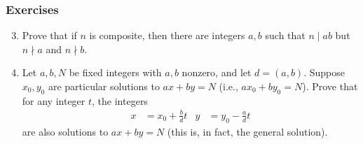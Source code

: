 \documentclass[../notes.tex]{subfiles}
\begin{document}
\subsubsection*{Exercises}
\begin{enumerate}[label={\textbf{\arabic*.}},ref={0.2.\arabic*}]
    \setcounter{enumi}{2}
    \item \label{exr:0.2.3}Prove that if $n$ is composite, then there are integers $a,b$ such that $n\mid ab$ but $n\nmid a$ and $n\nmid b$.
    \item \label{exr:0.2.4}Let $a,b,N$ be fixed integers with $a,b$ nonzero, and let $d=(a,b)$. Suppose $x_0,y_0$ are particular solutions to $ax+by=N$ (i.e., $ax_0+by_0=N$). Prove that for any integer $t$, the integers
    \begin{align*}
        x &= x_0+\frac{b}{d}t&
        y &= y_0-\frac{a}{d}t
    \end{align*}
    are also solutions to $ax+by=N$ (this is, in fact, the general solution).
\end{enumerate}
\end{document}
